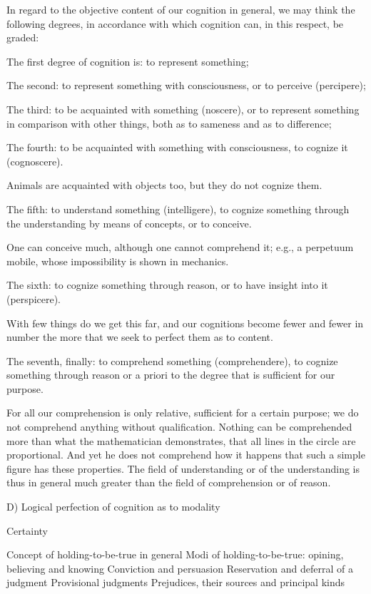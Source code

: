 In regard to the objective content of our cognition in general,
we may think the following degrees, in accordance with which
cognition can, in this respect, be graded:

The first degree of cognition is: to represent something;

The second: to represent something with consciousness,
or to perceive (percipere);

The third: to be acquainted with something (noscere), or
to represent something in comparison with other things,
both as to sameness and as to difference;

The fourth: to be acquainted with something with consciousness,
to cognize it (cognoscere).

Animals are acquainted with objects too, but they do not cognize them.

The fifth: to understand something (intelligere),
to cognize something through the understanding by means of concepts,
or to conceive.

One can conceive much, although one cannot comprehend it;
e.g., a perpetuum mobile, whose impossibility is shown in mechanics.

The sixth: to cognize something through reason, or
to have insight into it (perspicere).

With few things do we get this far,
and our cognitions become fewer and fewer in number
the more that we seek to perfect them as to content.

The seventh, finally: to comprehend something (comprehendere),
to cognize something through reason or a priori
to the degree that is sufficient for our purpose.

For all our comprehension is only relative,
sufficient for a certain purpose;
we do not comprehend anything without qualification.
Nothing can be comprehended more than what the mathematician demonstrates,
that all lines in the circle are proportional.
And yet he does not comprehend how it happens that such a simple
figure has these properties.
The field of understanding or of the understanding is thus in general
much greater than the field of comprehension or of reason.

D) Logical perfection of cognition as to modality

Certainty

    Concept of holding-to-be-true in general
    Modi of holding-to-be-true: opining, believing and knowing
    Conviction and persuasion
    Reservation and deferral of a judgment
    Provisional judgments
    Prejudices, their sources and principal kinds

